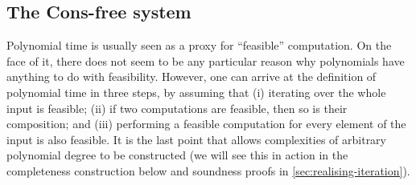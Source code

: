 \documentclass[acmsmall,screen]{acmart}
\begin{document}
\subsection{The Cons-free system}
\label{sec:cons-free-intro}

Polynomial time is usually seen as a proxy for ``feasible''
computation. On the face of it, there does not seem to be any
particular reason why polynomials have anything to do with
feasibility. However, one can arrive at the definition of polynomial
time in three steps, by assuming that (i) iterating over the whole
input is feasible; (ii) if two computations are feasible, then so is
their composition; and (iii) performing a feasible computation for
every element of the input is also feasible. It is the last point that
allows complexities of arbitrary polynomial degree to be constructed
(we will see this in action in the completeness construction below and
soundness proofs in \autoref{sec:realising-iteration}).
\end{document}
